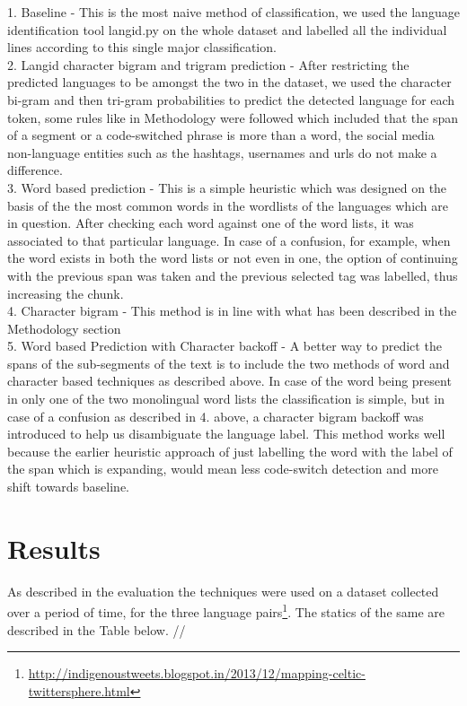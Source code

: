 \documentclass[11pt]{article}
\begin{document}
1. Baseline - This is the most naive method of classification, we used the language identification tool langid.py \cite{lui2012langid} on the whole dataset and labelled all the individual lines according to this single major classification. \\
2. Langid character bigram and trigram prediction - After restricting the predicted languages to be amongst the two in the dataset, we used the character bi-gram and then tri-gram probabilities to predict the detected language for each token, some rules like in Methodology were followed which included that the span of a segment or a code-switched phrase is more than a word, the social media non-language entities such as the hashtags, usernames and urls do not make a difference. \\
3. Word based prediction - This is a simple heuristic which was designed on the basis of the the most common words in the wordlists of the languages which are in question. After checking each word against one of the word lists, it was associated to that particular language. In case of a confusion, for example, when the word exists in both the word lists or not even in one, the option of continuing with the previous span was taken and the previous selected tag was labelled, thus increasing the chunk. \\
4. Character bigram - This method is in line with what has been described in the Methodology section \\
5. Word based Prediction with Character backoff - A better way to predict the spans of the sub-segments of the text is to include the two methods of word and character based techniques as described above. In case of the word being present in only one of the two monolingual word lists the classification is simple, but in case of a confusion as described in 4. above, a character bigram backoff was introduced to help us disambiguate the language label. This method works well because the earlier heuristic approach of just labelling the word with the label of the span which is expanding, would mean less code-switch detection and more shift towards baseline. \\


\section{Results}

As described in the evaluation the techniques were used on a dataset collected over a period of time, for the three language pairs\footnote{\url{http://indigenoustweets.blogspot.in/2013/12/mapping-celtic-twittersphere.html}}. The statics of the same are described in the Table below. // 
\end{document}
